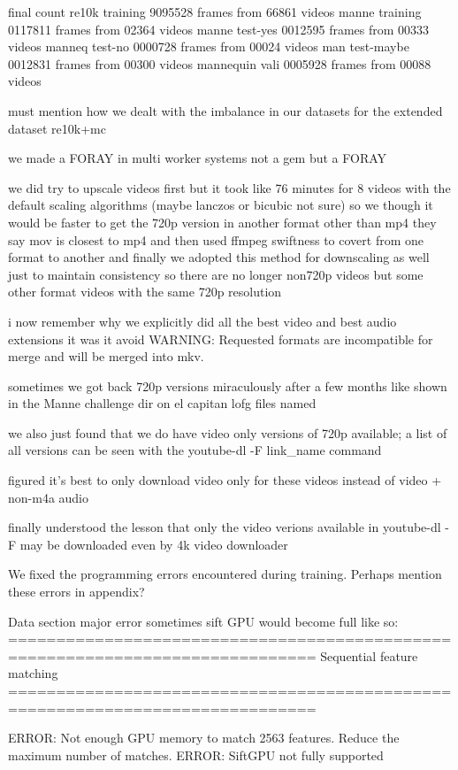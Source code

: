 final count 
re10k training 9095528 frames from 66861 videos 
manne training 0117811 frames from 02364 videos
manne test-yes 0012595 frames from 00333 videos
manneq test-no 0000728 frames from 00024 videos
man test-maybe 0012831 frames from 00300 videos
mannequin vali 0005928 frames from 00088 videos

must mention how we dealt with the imbalance in our datasets for the extended dataset re10k+mc

we made a FORAY in multi worker systems not a gem but a FORAY 

we did try to upscale videos first but it took like 76 minutes for 8 videos with the default scaling algorithms (maybe lanczos or bicubic not sure) 
so we though it would be faster to get the 720p version in another format other than mp4 they say mov is closest to mp4 and then used ffmpeg swiftness to covert from one format to another
and finally we adopted this method for downscaling as well
just to maintain consistency 
so there are no longer non720p videos but some other format videos with the same 720p resolution

i now remember why we explicitly did all the best video and best audio extensions it was it avoid 
WARNING: Requested formats are incompatible for merge and will be merged into mkv.

sometimes we got back 720p versions miraculously after a few months like shown in the Manne challenge dir on el capitan lofg files named


we also just found that we do have video only versions of 720p available; a list of all versions can be seen with the youtube-dl -F link\_name command

figured it's best to only download video only for these videos instead of video + non-m4a audio

finally understood the lesson that only the video verions available in youtube-dl -F may be downloaded even by 4k video downloader

We fixed the programming errors encountered during training. Perhaps mention these errors in appendix?

Data section major error sometimes sift GPU would become full like so:
==============================================================================
Sequential feature matching
==============================================================================

ERROR: Not enough GPU memory to match 2563 features. Reduce the maximum number of matches.
ERROR: SiftGPU not fully supported

